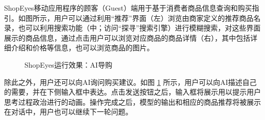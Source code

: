 ShopEyes移动应用程序的顾客（Guest）端用于基于消费者商品信息查询和购买指引。如图所示，用户可以通过利用“推荐”界面（左）浏览由商家定义的推荐商品名录，也可以利用搜索功能（中；访问“探寻”搜索引擎）进行模糊搜索，对这些界面展示的商品信息，通过点击用户可以浏览对应商品的商品详情（右），其中包括详细介绍和价格等信息，也可以浏览商品的图片。

\begin{figure}[htbp]
    \centering
    \hfill
	\caption{ShopEyes运行效果：AI导购}
	\label{fig:seg-assist}
\end{figure}

除此之外，用户还可以向AI询问购买建议。如图 \ref{fig:seg-assist} 所示，用户可以向AI描述自己的需要，并在下侧输入框中表达。点击发送按钮之后，输入框将展示用以提示用户思考过程政治进行的动画。操作完成之后，模型的输出和相应的商品推荐将被展示在对话中，用户也可以继续下一轮问题。

